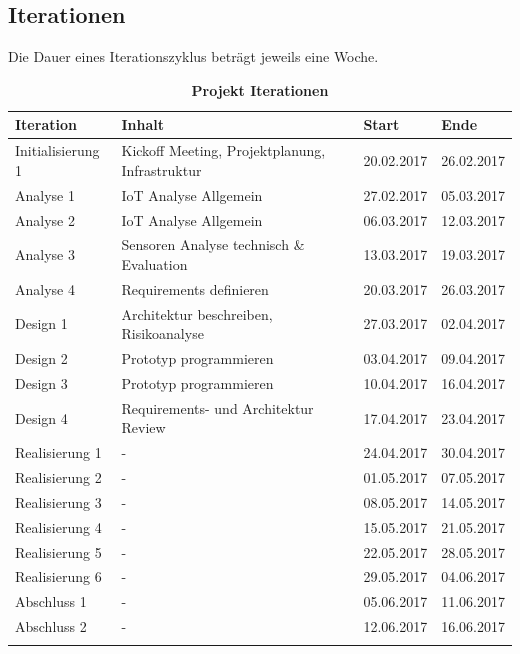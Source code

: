 \subsection{Iterationen}
Die Dauer eines Iterationszyklus beträgt jeweils eine Woche. 
\begin{table}[htb]
\centering
    \begin{tabular}{@{} p{3cm} l l l@{}}\toprule    
    {Iteration} & {Inhalt} & {Start} & {Ende}\\ \midrule
    Initialisierung 1 & Kickoff Meeting, Projektplanung, Infrastruktur & 20.02.2017 & 26.02.2017\\
    Analyse 1 & IoT Analyse Allgemein & 27.02.2017 & 05.03.2017\\ \addlinespace
    Analyse 2 & IoT Analyse Allgemein & 06.03.2017 & 12.03.2017\\ \addlinespace
    Analyse 3 & Sensoren Analyse technisch \& Evaluation & 13.03.2017 & 19.03.2017\\ \addlinespace
    Analyse 4 & Requirements definieren & 20.03.2017 & 26.03.2017\\ \addlinespace
    Design 1 & Architektur beschreiben, Risikoanalyse & 27.03.2017 & 02.04.2017\\ \addlinespace
    Design 2 & Prototyp programmieren & 03.04.2017  & 09.04.2017\\ \addlinespace
    Design 3 & Prototyp programmieren & 10.04.2017  & 16.04.2017\\ \addlinespace
    Design 4 & Requirements- und Architektur Review & 17.04.2017  & 23.04.2017\\ \addlinespace
    Realisierung 1 & - & 24.04.2017  & 30.04.2017\\ \addlinespace
    Realisierung 2 & - & 01.05.2017  & 07.05.2017\\ \addlinespace
    Realisierung 3 & - & 08.05.2017  & 14.05.2017\\ \addlinespace
    Realisierung 4 & - & 15.05.2017  & 21.05.2017\\ \addlinespace
    Realisierung 5 & - & 22.05.2017  & 28.05.2017\\ \addlinespace
    Realisierung 6 & - & 29.05.2017  & 04.06.2017\\ \addlinespace
    Abschluss 1 & - &  05.06.2017 & 11.06.2017\\ \addlinespace
    Abschluss 2 & - &  12.06.2017 & 16.06.2017\\ \addlinespace
    \bottomrule
    \end{tabular}
\caption{\textbf{Projekt Iterationen}}
\end{table}

